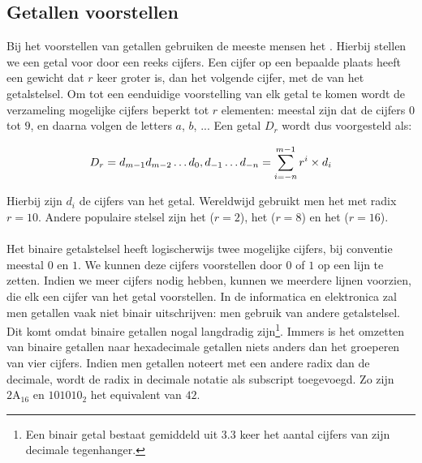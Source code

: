\subsection{Getallen voorstellen}
Bij het voorstellen van getallen gebruiken de meeste mensen het . Hierbij stellen we een getal voor door een reeks cijfers. Een cijfer op een bepaalde plaats heeft een gewicht dat $r$ keer groter is, dan het volgende cijfer, met de  van het getalstelsel. Om tot een eenduidige voorstelling van elk getal te komen wordt de verzameling mogelijke cijfers beperkt tot $r$ elementen: meestal zijn dat de cijfers $0$ tot $9$, en daarna volgen de letters $a$, $b$, ... Een getal $D_r$ wordt dus voorgesteld als:

\begin{equation}
D_r=d_{m-1}d_{m-2}\ldots d_0,d_{-1}\ldots d_{-n}=\displaystyle\sum_{i=-n}^{m-1}{r^i\times d_i}
\eqnlab{numberRepresentation}
\end{equation}

Hierbij zijn $d_i$ de cijfers van het getal. Wereldwijd gebruikt men het  met radix $r=10$. Andere populaire stelsel zijn het  ($r=2$), het  ($r=8$) en het  ($r=16$).

\paragraph{}
Het binaire getalstelsel heeft logischerwijs twee mogelijke cijfers, bij conventie meestal $0$ en $1$. We kunnen deze cijfers voorstellen door $0$ of $1$ op een lijn te zetten. Indien we meer cijfers nodig hebben, kunnen we meerdere lijnen voorzien, die elk een cijfer van het getal voorstellen. In de informatica en elektronica zal men getallen vaak niet binair uitschrijven: men gebruik van andere getalstelsel. Dit komt omdat binaire getallen nogal langdradig zijn\footnote{Een binair getal bestaat gemiddeld uit $3.3$ keer het aantal cijfers van zijn decimale tegenhanger.}. Immers is het omzetten van binaire getallen naar hexadecimale getallen niets anders dan het groeperen van vier cijfers. Indien men getallen noteert met een andere radix dan de decimale, wordt de radix in decimale notatie als subscript toegevoegd. Zo zijn $\mbox{2A}_{16}$ en $\mbox{101010}_{2}$ het equivalent van $42$.

